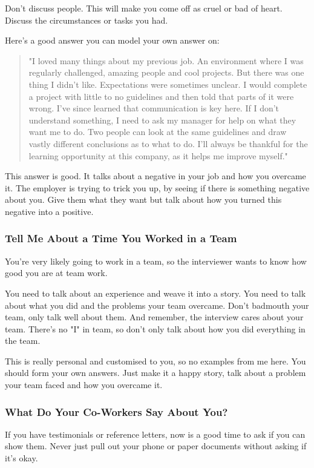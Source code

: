 \documentclass{article}
\begin{document}
Don't discuss people. This will make you come off as cruel or bad of
heart. Discuss the circumstances or tasks you had.

Here's a good answer you can model your own answer on:
\begin{quote}
    "I loved many things about my previous job. An environment where I was
regularly challenged, amazing people and cool projects. But there was
one thing I didn't like. Expectations were sometimes unclear. I would
complete a project with little to no guidelines and then told that parts
of it were wrong. I've since learned that communication is key here. If
I don't understand something, I need to ask my manager for help on what
they want me to do. Two people can look at the same guidelines and draw
vastly different conclusions as to what to do. I'll always be thankful
for the learning opportunity at this company, as it helps me improve
myself."
\end{quote}
This answer is good. It talks about a negative in your job and how you
overcame it. The employer is trying to trick you up, by seeing if there
is something negative about you. Give them what they want but talk about
how you turned this negative into a positive.
\subsubsection{Tell Me About a Time You Worked in a Team}
You're very likely going to work in a team, so the interviewer wants to
know how good you are at team work.

You need to talk about an experience and weave it into a story. You need
to talk about what you did and the problems your team overcame. Don't
badmouth your team, only talk well about them. And remember, the
interview cares about your team. There's no "I" in team, so don't only
talk about how you did everything in the team.

This is really personal and customised to you, so no examples from me
here. You should form your own answers. Just make it a happy story, talk
about a problem your team faced and how you overcame it.
\subsubsection{What Do Your Co-Workers Say About You?}
If you have testimonials or reference letters, now is a good time to ask
if you can show them. Never just pull out your phone or paper documents
without asking if it's okay.
\end{document}
